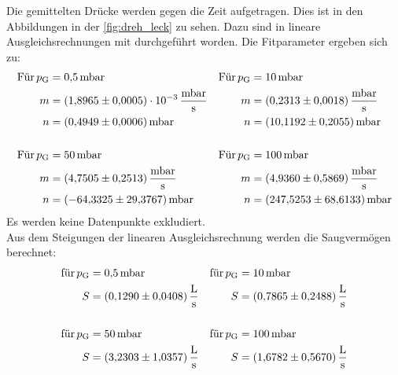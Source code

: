     \noindent Die gemittelten Drücke werden gegen die Zeit aufgetragen. Dies ist in den Abbildungen in der \autoref{fig:dreh_leck} zu sehen. Dazu sind in lineare Ausgleichsrechnungen 
    mit \cite{scipy} durchgeführt worden. Die Fitparameter ergeben sich zu:
    \begin{align*}
      \text{Für} \,  p_\text{G} &= \SI{0.5}{\milli\bar} & \text{Für} \,  p_\text{G} &= \SI{10}{\milli\bar}\\
      m &= \SI{1.8965(5)e-3}{\milli\bar\per\second} & m &= \SI{0.2313 \pm 0.0018}{\milli\bar\per\second} \\
      n &= \SI{0.4949 \pm 0.0006}{\milli\bar} & n &= \SI{10.1192 \pm 0.2055}{\milli\bar} \\
      \\
      \text{Für} \,  p_\text{G} &= \SI{50}{\milli\bar} & \text{Für} \,  p_\text{G} &= \SI{100}{\milli\bar}\\
      m &= \SI{4.7505 \pm 0.2513}{\milli\bar\per\second} & m &= \SI{4.9360 \pm 0.5869}{\milli\bar\per\second} \\
      n &= \SI{-64.3325 \pm 29.3767}{\milli\bar} & n &= \SI{247.5253 \pm 68.6133}{\milli\bar} 
    \end{align*}
    Es werden keine Datenpunkte exkludiert. \\
    Aus dem Steigungen der linearen Ausgleichsrechnung werden die Saugvermögen berechnet:
    \begin{align*}
      \text{für} \, p_\text{G} &= \SI{0.5}{\milli\bar} & \text{für} \, p_\text{G} &= \SI{10}{\milli\bar} \\
      S &= \SI{0.1290 \pm 0.0408}{\litre\per\second}  & S &= \SI{0.7865 \pm 0.2488}{\litre\per\second}  \\
      \\
      \text{für} \, p_\text{G} &= \SI{50}{\milli\bar} & \text{für} \, p_\text{G} &= \SI{100}{\milli\bar} \\
      S &= \SI{3.2303 \pm 1.0357}{\litre\per\second}  & S &= \SI{1.6782 \pm 0.5670}{\litre\per\second}  
    \end{align*}

